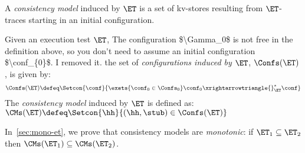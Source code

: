 A \emph{consistency model} induced by $\ET$ is a set of kv-stores
resulting from $\ET$-traces starting in an 
initial configuration. 

\begin{definition}
\label{def:cm}
Given an execution test $\ET$,  
\ac{The configuration $\Gamma_0$ is not free in the definition above, 
so you don't need to assume an initial configuration $\conf_{0}$. I removed 
it.}
the set of \emph{configurations induced by $\ET$},  $\Confs(\ET)$, is   given by: 
\[
\Confs(\ET)\defeq 
\Setcon{ \conf}{ 
	\exsts{\conf_0 \in \Confs_0}
	\conf_0 \xrightarrowtriangle{}_{\ET}^{*} \conf
}
\]
The \emph{consistency model} induced by $\ET$ is defined as:
\( 
\CMs(\ET) \defeq \Setcon{ \hh }{ (\hh, \stub) \in \Confs(\ET) }
\)
\end{definition}


\noindent In~\cref{sec:mono-et}, we prove that consistency models are 
\emph{monotonic}: 
if  $\ET_1 \subseteq \ET_2$ then $\CMs(\ET_1) \subseteq \CMs(\ET_2)$.

